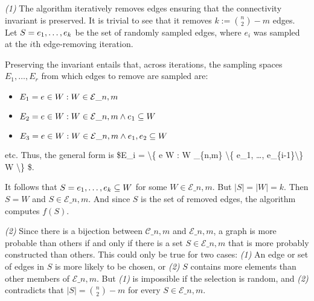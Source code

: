 \documentclass[
]{article}
\providecommand{\tightlist}{%
  \setlength{\itemsep}{0pt}\setlength{\parskip}{0pt}}
\begin{document}
\emph{(1)} The algorithm iteratively removes edges ensuring that the
connectivity invariant is preserved. It is trivial to see that it
removes \(k := \binom{n}{2} - m\) edges. Let
\(S = \\{e_1, \ldots, e_{k}\\}\) be the set of randomly sampled edges,
where \(e_i\) was sampled at the \(i\)th edge-removing iteration.

Preserving the invariant entails that, across iterations, the sampling
spaces \(E_1, \ldots, E_r\) from which edges to remove are sampled are:

\begin{itemize}
\tightlist
\item
  \(E_1 = \\{ e \in W : W \in \mathcal{E}\_{n,m} \\}\)
\item
  \(E_2 = \\{ e \in W : W \in \mathcal{E}\_{n,m} \land \\{ e_1 \\} \subseteq W \\}\)
\item
  \(E_3 = \\{ e \in W : W \in \mathcal{E}\_{n,m} \land \\{ e_1, e_2 \\} \subseteq W \\}\)
\end{itemize}

etc. Thus, the general form is \$E\_i = \textbackslash\{ e \in W : W
\in {}\_\{n,m\} \land \textbackslash\{ e\_1, \ldots,
e\_\{i-1\}\textbackslash\} \subseteq W \textbackslash\} \$.

It follows that \(S = \\{ e_1, \ldots, e_k \\} \subseteq W\) for some
\(W \in \mathcal{E}\_{n,m}\). But \(|S| = |W| = k\). Then \(S = W\) and
\(S \in \mathcal{E}\_{n,m}\). And since \(S\) is the set of removed
edges, the algorithm computes \(f(S)\).

\emph{(2)} Since there is a bijection between \(\mathcal{C}\_{n,m}\) and
\(\mathcal{E}\_{n,m}\), a graph is more probable than others if and only
if there is a set \(S \in \mathcal{E}\_{n,m}\) that is more probably
constructed than others. This could only be true for two cases:
\emph{(1)} An edge or set of edges in \(S\) is more likely to be chosen,
or \emph{(2)} \(S\) contains more elements than other members of
\(\mathcal{E}\_{n,m}\). But \emph{(1)} is impossible if the selection is
random, and \emph{(2)} contradicts that \(|S| = \binom{n}{2} - m\) for
every \(S \in \mathcal{E}\_{n,m}\).
\end{document}
